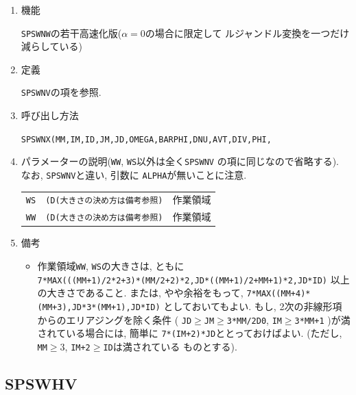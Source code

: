 \documentclass[a4j,fleqn]{jarticle}
\begin{document}
\begin{enumerate}

\item 機能

{\tt SPSWNW}の若干高速化版($\alpha=0$の場合に限定して
ルジャンドル変換を一つだけ減らしている)

\item 定義

{\tt SPSWNV}の項を参照.

\item 呼び出し方法 

{\tt SPSWNX(MM,IM,ID,JM,JD,OMEGA,BARPHI,DNU,AVT,DIV,PHI,}\\
\hspace*{10em}{\tt DAVT,DDIV,DPHI,RN,IRM,IT,T,Y,IP,P,R,IA,A,Q,WS,WW)}

\item パラメーターの説明({\tt WW}, {\tt WS}以外は全く{\tt SPSWNV}
の項に同じなので省略する). なお, {\tt SPSWNV}と違い, 引数に
{\tt ALPHA}が無いことに注意.

\begin{tabular}{lll}
{\tt WS}  & {\tt (D(大きさの決め方は備考参照)} & 作業領域\\
{\tt WW}  & {\tt (D(大きさの決め方は備考参照)} & 作業領域
\end{tabular}

\item 備考

\begin{itemize}

\item 作業領域{\tt WW}, {\tt WS}の大きさは, ともに\\
     {\tt 7*MAX(((MM+1)/2*2+3)*(MM/2+2)*2,JD*((MM+1)/2+MM+1)*2,JD*ID)}
    以上の大きさであること. または, やや余裕をもって,
     {\tt 7*MAX((MM+4)*(MM+3),JD*3*(MM+1),JD*ID)}
    としておいてもよい. もし, 2次の非線形項からのエリアジングを除く条件
     ( {\tt JD}$\ge${\tt JM}$\ge${\tt 3*MM/2D0}, 
      {\tt IM}$\ge${\tt 3*MM+1} )が満されている場合には, 簡単に
      {\tt 7*(IM+2)*JD}ととっておけばよい.
     (ただし, {\tt MM}$\ge 3$, {\tt IM+2}$\ge${\tt ID}は満されている
    ものとする).

\end{itemize}

\end{enumerate}


\subsection{SPSWHV}
\end{document}

